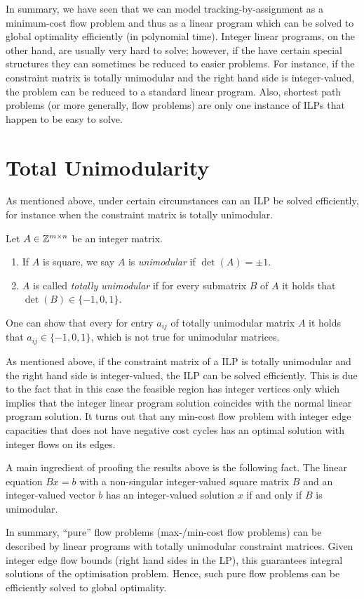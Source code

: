 
In summary, we have seen that we can model tracking-by-assignment as a
minimum-cost flow problem and thus as a linear program which can be solved to
global optimality efficiently (in polynomial time). Integer linear programs, on
the other hand, are usually very hard to solve; however, if the have certain
special structures they can sometimes be reduced to easier problems. For
instance, if the constraint matrix is totally unimodular and the right hand side
is integer-valued, the problem can be reduced to a standard linear
program. Also, shortest path problems (or more generally, flow problems) are
only one instance of ILPs that happen to be easy to solve.

\section{Total Unimodularity}
As mentioned above, under certain circumstances can an ILP be solved
efficiently, for instance when the constraint matrix is totally unimodular.
\begin{definition}
  Let $A \in \mathbb{Z}^{m \times n}$ be an integer matrix.
  \begin{enumerate}[label=(\alph*)]
  \item If $A$ is square, we say $A$ is \emph{unimodular} if $\det(A) = \pm 1$.
  \item $A$ is called \emph{totally unimodular} if for every submatrix $B$ of
    $A$ it holds that $\det(B) \in \{-1,0,1\}$.
  \end{enumerate}
  One can show that every for entry $a_{ij}$ of totally unimodular matrix $A$ it
  holds that $a_{ij} \in \{-1,0,1\}$, which is not true for unimodular matrices.
\end{definition}

As mentioned above, if the constraint matrix of a ILP is totally unimodular and
the right hand side is integer-valued, the ILP can be solved efficiently. This
is due to the fact that in this case the feasible region has integer vertices
only which implies that the integer linear program solution coincides with the
normal linear program solution. It turns out that any min-cost flow problem with
integer edge capacities that does not have negative cost cycles has an optimal
solution with integer flows on its edges.

A main ingredient of proofing the results above is the following fact. The
linear equation $Bx = b$ with a non-singular integer-valued square matrix $B$
and an integer-valued vector $b$ has an integer-valued solution $x$ if and only
if $B$ is unimodular.

In summary, ``pure'' flow problems (max-/min-cost flow problems) can be
described by linear programs with totally unimodular constraint matrices.  Given
integer edge flow bounds (right hand sides in the LP), this guarantees integral
solutions of the optimisation problem. Hence, such pure flow problems can be
efficiently solved to global optimality.

